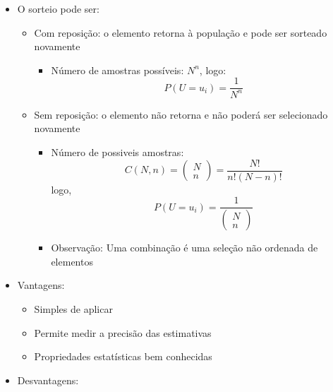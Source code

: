 \documentclass[12pt]{article}
\begin{document}
\begin{itemize}
\begin{itemize}
\begin{itemize}
\begin{scriptsize}
                $N$: Número de unidade amostral da população \\
                $n$: Número de unidade amostral de amostras
            \end{scriptsize}
        \end{itemize}
        \item O sorteio pode ser:
        \begin{itemize}
            \item Com reposição: o elemento retorna à população e pode ser 
            sorteado novamente
            \begin{itemize}
                \item Número de amostras possíveis: $N^n$, logo:
                \[
                P(U = u_i) = \frac{1}{N^n}
                \]
            \end{itemize}
            \item Sem reposição: o elemento não retorna e não poderá ser 
            selecionado novamente
            \begin{itemize}
                \item Número de possiveis amostras:
                \[
                C(N, n) = \left(\begin{array}{c} N \\ n \end{array}\right)
                = \frac{N!}{n!(N-n)!}
                \]
                logo,
                \[
                P(U = u_i) = \frac{1}{\left(\begin{array}{c} N \\ n \end{array}\right)}
                \]
                \item Observação: Uma combinação é uma seleção não ordenada de 
                elementos
            \end{itemize}
        \end{itemize}
        \item Vantagens: 
        \begin{itemize}
            \item Simples de aplicar
            \item Permite medir a precisão das estimativas
            \item Propriedades estatísticas bem conhecidas
        \end{itemize}
        \item Desvantagens:
        \begin{itemize}

\end{itemize}
\end{itemize}
\end{itemize}
\end{document}
